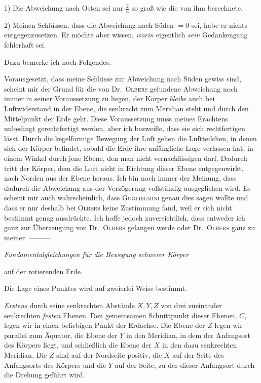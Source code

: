 1) Die Abweichung nach Osten sei nur $\tfrac23$ so groß wie die von ihm berechnete.

2) Meinen Schlüssen, dass die Abweichung nach Süden $=0$ sei, habe er nichts entgegenzusetzen. Er möchte aber wissen, \textit{worin} eigentlich \textit{sein} Gedankengang fehlerhaft sei.

Dazu bemerke ich noch Folgendes.

Vorausgesetzt, dass meine Schlüsse zur Abweichung nach Süden gewiss sind, scheint mir der Grund für die von Dr.\ \textsc{Olbers} gefundene Abweichung noch immer in seiner Voraussetzung zu liegen, der Körper \textit{bleibe} auch bei Luftwiderstand in der Ebene, die senkrecht zum Meridian steht und durch den Mittelpunkt der Erde geht. Diese Voraussetzung muss meines Erachtens unbedingt gerechtfertigt werden, aber ich bezweifle, dass sie sich rechtfertigen lässt. Durch die kegelförmige Bewegung der Luft gehen die Luftteilchen, in denen sich der Körper befindet, sobald die Erde ihre anfängliche Lage verlassen hat, in einem Winkel durch jene Ebene, den man nicht vernachlässigen darf. Dadurch tritt der Körper, dem die Luft nicht in Richtung dieser Ebene entgegenwirkt, nach Norden aus der Ebene heraus. Ich bin noch immer der Meinung, dass dadurch die Abweichung aus der Verzögerung vollständig ausgeglichen wird. Es scheint mir auch wahrscheinlich, dass \textsc{Guglielmini} genau dies sagen wollte und dass er nur deshalb bei \textsc{Olbers} keine Zustimmung fand, weil er sich nicht bestimmt genug ausdrückte. Ich hoffe jedoch zuversichtlich, dass entweder ich ganz zur Überzeugung von Dr.\ \textsc{Olbers} gelangen werde oder Dr.\ \textsc{Olbers} ganz zu meiner. —\quad—\quad—

\begin{center}{\large\itshape Fundamentalgleichungen für die Bewegung schwerer Körper\par auf der rotierenden Erde.}\end{center}
Die Lage eines Punktes wird auf zweierlei Weise bestimmt.

\textit{Erstens} durch seine senkrechten Abstände $X,Y,Z$ von drei zueinander senkrechten \textit{festen} Ebenen. Den gemeinsamen Schnittpunkt dieser Ebenen, $C$, legen wir in einen beliebigen Punkt der Erdachse. Die Ebene der $Z$ legen wir parallel zum Äquator, die Ebene der $Y$ in den Meridian, in dem der Anfangsort des Körpers liegt, und schließlich die Ebene der $X$ in den dazu senkrechten Meridian. Die $Z$ sind auf der Nordseite positiv, die $X$ auf der Seite des Anfangsorts des Körpers und die $Y$ auf der Seite, zu der dieser Anfangsort durch die Drehung geführt wird.

